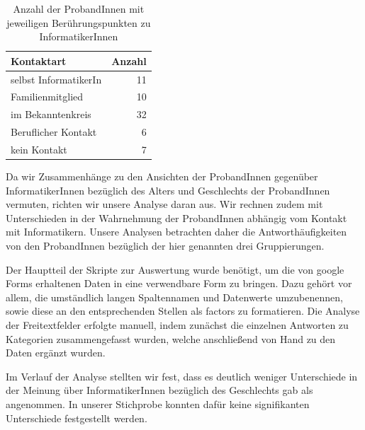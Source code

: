 \documentclass[de]{agse-empir-report}\usepackage[]{graphicx}\usepackage[]{color}
\newenvironment{knitrout}{}{} %
\begin{document}
\begin{table}
   \centering
\begin{knitrout}
\color{fgcolor}
\begin{tabular}{lr}
\toprule
Kontaktart & Anzahl\\
\midrule
selbst InformatikerIn & 11\\
Familienmitglied & 10\\
im Bekanntenkreis & 32\\
Beruflicher Kontakt & 6\\
kein Kontakt & 7\\
\bottomrule
\end{tabular}


\end{knitrout}
   \caption{Anzahl der ProbandInnen mit jeweiligen Ber\"uhrungspunkten zu InformatikerInnen}
   \label{tab:contact}
\end{table}


Da wir Zusammenh\"ange zu den Ansichten der ProbandInnen gegen\"uber InformatikerInnen bez\"uglich des Alters und Geschlechts der ProbandInnen vermuten, richten wir unsere Analyse daran aus. Wir rechnen zudem mit Unterschieden in der Wahrnehmung der ProbandInnen abh\"angig vom Kontakt mit Informatikern. Unsere Analysen betrachten daher die Antworth\"aufigkeiten von den ProbandInnen bez\"uglich der hier genannten drei Gruppierungen.

Der Hauptteil der Skripte zur Auswertung wurde ben\"otigt, um die von google Forms erhaltenen Daten in eine verwendbare Form zu bringen. Dazu geh\"ort vor allem, die umst\"andlich langen Spaltennamen und Datenwerte umzubenennen, sowie diese an den entsprechenden Stellen als factors zu formatieren. Die Analyse der Freitextfelder erfolgte manuell, indem zun\"achst die einzelnen Antworten zu Kategorien zusammengefasst wurden, welche anschlie{\ss}end von Hand zu den Daten erg\"anzt wurden.


Im Verlauf der Analyse stellten wir fest, dass es deutlich weniger Unterschiede in der Meinung \"uber InformatikerInnen bez\"uglich des Geschlechts gab als angenommen. In unserer Stichprobe konnten daf\"ur keine signifikanten Unterschiede festgestellt werden.
\end{document}
